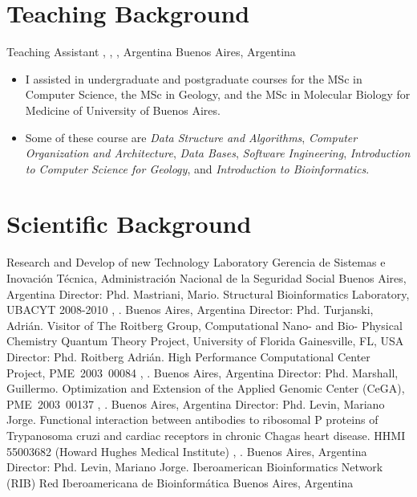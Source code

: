 	\pagebreak[3]

\section{Teaching Background}\label{docentes:desde}

        {Teaching Assistant}
	{\DC, \FCEN, \UBA, Argentina}
	{Buenos Aires, Argentina}
	{}
	{\begin{itemize}
	\item I assisted in undergraduate and postgraduate courses for the MSc in Computer Science,
		the MSc in Geology, and the MSc in Molecular Biology for Medicine of University of Buenos Aires.
	\item Some of these course are \emph{Data Structure and Algorithms},
		\emph{Computer Organization and Architecture}, \emph{Data Bases},
		\emph{Software Ingineering}, \emph{Introduction to Computer Science for Geology},
		and \emph{Introduction to Bioinformatics}.
	\end{itemize}}

	\pagebreak[4]

\section{Scientific Background}\label{cientificos:desde}

	{Research and Develop of new Technology Laboratory}
	{Gerencia de Sistemas e Inovación Técnica, Administración Nacional de la Seguridad Social}
	{Buenos Aires, Argentina}
	{}
	{Director: Phd. Mastriani, Mario.}
	{Structural Bioinformatics Laboratory, UBACYT 2008-2010}
	{\FCEN, \UBA.}
	{Buenos Aires, Argentina}
	{}
	{Director: Phd. Turjanski, Adrián.}
        {Visitor of The Roitberg Group, Computational Nano- and Bio- Physical Chemistry}
	{Quantum Theory Project, University of Florida}
	{Gainesville, FL, USA}
	{}
	{Director: Phd. Roitberg Adrián.}
	{High Performance Computational Center Project, PME~2003~00084}
	{\FCEN, \UBA.}
	{Buenos Aires, Argentina}
	{}
	{Director: Phd. Marshall, Guillermo.}
        {Optimization and Extension of the Applied Genomic Center (CeGA), PME~2003~00137}
	{\FCEN, \UBA.}
	{Buenos Aires, Argentina}
	{}
	{Director: Phd. Levin, Mariano Jorge.}
	{Functional interaction between antibodies to ribosomal P proteins of Trypanosoma cruzi and cardiac receptors in chronic Chagas heart disease. HHMI 55003682 (Howard Hughes Medical Institute)}
	{\FCEN, \UBA.}
	{Buenos Aires, Argentina}
	{}
	{Director: Phd. Levin, Mariano Jorge.}
	{Iberoamerican Bioinformatics Network (RIB)}
	{Red Iberoamericana de Bioinformática}
	{Buenos Aires, Argentina}
	{}
	{}

